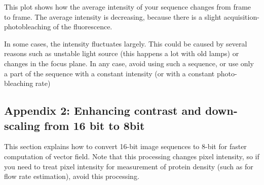 \documentclass{article}
\begin{document}
This plot shows how the average intensity of your sequence changes from
frame to frame. The average intensity is decreasing, because there is a
slight acquisition-photobleaching of the fluorescence.

In some cases, the intensity fluctuates largely. This could be caused by
several reasons such as unstable light source (this happens a lot with
old lamps) or changes in the focus plane. In any case, avoid using such
a sequence, or use only a part of the sequence with a constant intensity
(or with a constant photo-bleaching rate)

\subsection{Appendix 2: Enhancing contrast and down-scaling from 16 bit to 8bit}

This section explains how to convert 16-bit image sequences to 8-bit for faster computation of vector field. Note that this processing changes pixel intensity, so if you need to treat pixel intensity for measurement of protein density (such as for flow rate estimation), avoid this processing. 
\end{document}

